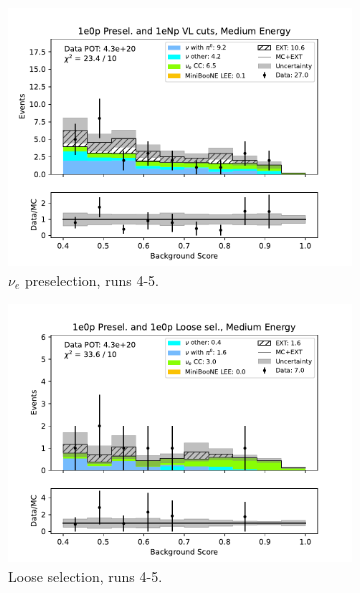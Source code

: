 \begin{figure}[H]
\begin{subfigure}{0.5\linewidth}
        \includegraphics[width=\linewidth]{technote/Sidebands/Figures/NearSideband/near_sideband_bkg_score_run4b4c4d5_ZP_ZP_MEDIUM_ENERGY.pdf}
        \caption{$\nu_e$ preselection, runs 4-5.}
    \end{subfigure}%
    \begin{subfigure}{0.5\linewidth}
        \includegraphics[width=\linewidth]{technote/Sidebands/Figures/NearSideband/near_sideband_bkg_score_run4b4c4d5_ZP_ZPLOOSESEL_MEDIUM_ENERGY.pdf}
        \caption{Loose selection, runs 4-5.}
    \end{subfigure}
    \begin{subfigure}{0.5\linewidth}

\end{subfigure}
\end{figure}
